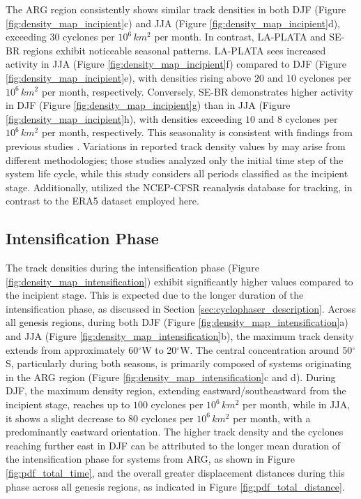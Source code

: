 The ARG region consistently shows similar track densities in both DJF (Figure \ref{fig:density_map_incipient}c) and JJA (Figure \ref{fig:density_map_incipient}d), exceeding \(30\) cyclones per \(10^6 \, km^2\) per month. In contrast, LA-PLATA and SE-BR regions exhibit noticeable seasonal patterns. LA-PLATA sees increased activity in JJA (Figure \ref{fig:density_map_incipient}f) compared to DJF (Figure \ref{fig:density_map_incipient}e), with densities rising above \(20\) and \(10\) cyclones per \(10^6 \, km^2\) per month, respectively. Conversely, SE-BR demonstrates higher activity in DJF (Figure \ref{fig:density_map_incipient}g) than in JJA (Figure \ref{fig:density_map_incipient}h), with densities exceeding \(10\) and \(8\) cyclones per \(10^6 \, km^2\) per month, respectively. This seasonality is consistent with findings from previous studies \citep{gan1991surface, hoskins2005new, mendes2010climatology, reboita2010south, gramcianinov2019properties, crespo2021potential}. Variations in reported track density values by \citep{gramcianinov2020analysis, gramcianinov2019properties} may arise from different methodologies; those studies analyzed only the initial time step of the system life cycle, while this study considers all periods classified as the incipient stage. Additionally, \citet{gramcianinov2019properties} utilized the NCEP-CFSR reanalysis database for tracking, in contrast to the ERA5 dataset employed here.


\subsection{Intensification Phase}  \label{sec:intensification_phase}

The track densities during the intensification phase (Figure \ref{fig:density_map_intensification}) exhibit significantly higher values compared to the incipient stage. This is expected due to the longer duration of the intensification phase, as discussed in Section \ref{sec:cyclophaser_description}. Across all genesis regions, during both DJF (Figure \ref{fig:density_map_intensification}a) and JJA (Figure \ref{fig:density_map_intensification}b), the maximum track density extends from approximately 60$^\circ$W to 20$^\circ$W. The central concentration around 50$^\circ$S, particularly during both seasons, is primarily composed of systems originating in the ARG region (Figure \ref{fig:density_map_intensification}c and d). During DJF, the maximum density region, extending eastward/southeastward from the incipient stage, reaches up to \(100\) cyclones per \(10^6 \, km^2\) per month, while in JJA, it shows a slight decrease to \(80\) cyclones per \(10^6 \, km^2\) per month, with a predominantly eastward orientation. The higher track density and the cyclones reaching further east in DJF can be attributed to the longer mean duration of the intensification phase for systems from ARG, as shown in Figure \ref{fig:pdf_total_time}, and the overall greater displacement distances during this phase across all genesis regions, as indicated in Figure \ref{fig:pdf_total_distance}.

